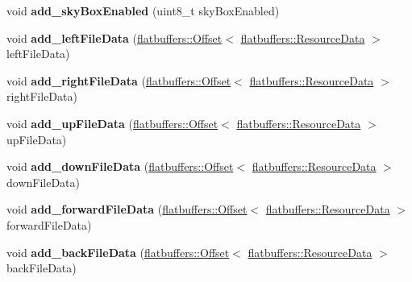 \begin{DoxyCompactItemize}
void {\bfseries add\+\_\+sky\+Box\+Enabled} (uint8\+\_\+t sky\+Box\+Enabled)
\item 
\mbox{\label{structflatbuffers_1_1UserCameraOptionsBuilder_a90fd56f2df0ac711ac0dea86279f5bfc}} 
void {\bfseries add\+\_\+left\+File\+Data} (\hyperlink{structflatbuffers_1_1Offset}{flatbuffers\+::\+Offset}$<$ \hyperlink{structflatbuffers_1_1ResourceData}{flatbuffers\+::\+Resource\+Data} $>$ left\+File\+Data)
\item 
\mbox{\label{structflatbuffers_1_1UserCameraOptionsBuilder_a05e2f0e8fb920c61e58797e36d09f7a4}} 
void {\bfseries add\+\_\+right\+File\+Data} (\hyperlink{structflatbuffers_1_1Offset}{flatbuffers\+::\+Offset}$<$ \hyperlink{structflatbuffers_1_1ResourceData}{flatbuffers\+::\+Resource\+Data} $>$ right\+File\+Data)
\item 
\mbox{\label{structflatbuffers_1_1UserCameraOptionsBuilder_a6aa0ee0c367540b387fe6a1b54c88bcc}} 
void {\bfseries add\+\_\+up\+File\+Data} (\hyperlink{structflatbuffers_1_1Offset}{flatbuffers\+::\+Offset}$<$ \hyperlink{structflatbuffers_1_1ResourceData}{flatbuffers\+::\+Resource\+Data} $>$ up\+File\+Data)
\item 
\mbox{\label{structflatbuffers_1_1UserCameraOptionsBuilder_a1585368fddad5d794145206aea2d1f6c}} 
void {\bfseries add\+\_\+down\+File\+Data} (\hyperlink{structflatbuffers_1_1Offset}{flatbuffers\+::\+Offset}$<$ \hyperlink{structflatbuffers_1_1ResourceData}{flatbuffers\+::\+Resource\+Data} $>$ down\+File\+Data)
\item 
\mbox{\label{structflatbuffers_1_1UserCameraOptionsBuilder_abe546f168ccc56ac435809b62c0085aa}} 
void {\bfseries add\+\_\+forward\+File\+Data} (\hyperlink{structflatbuffers_1_1Offset}{flatbuffers\+::\+Offset}$<$ \hyperlink{structflatbuffers_1_1ResourceData}{flatbuffers\+::\+Resource\+Data} $>$ forward\+File\+Data)
\item 
\mbox{\label{structflatbuffers_1_1UserCameraOptionsBuilder_a869f420aea925a0ee3d10e3efa9bd0a3}} 
void {\bfseries add\+\_\+back\+File\+Data} (\hyperlink{structflatbuffers_1_1Offset}{flatbuffers\+::\+Offset}$<$ \hyperlink{structflatbuffers_1_1ResourceData}{flatbuffers\+::\+Resource\+Data} $>$ back\+File\+Data)

\end{DoxyCompactItemize}
